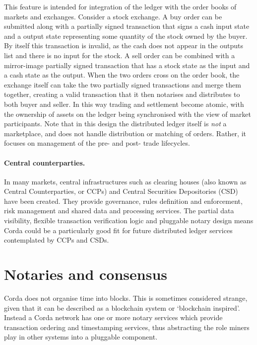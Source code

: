 \documentclass{article}
\begin{document}
This feature is intended for integration of the ledger with the order books of markets and exchanges. Consider a stock
exchange. A buy order can be submitted along with a partially signed transaction that signs a cash input state
and a output state representing some quantity of the stock owned by the buyer. By itself this transaction is invalid,
as the cash does not appear in the outputs list and there is no input for the stock. A sell order can be combined with
a mirror-image partially signed transaction that has a stock state as the input and a cash state as the output. When
the two orders cross on the order book, the exchange itself can take the two partially signed transactions and merge
them together, creating a valid transaction that it then notarises and distributes to both buyer and seller. In this
way trading and settlement become atomic, with the ownership of assets on the ledger being synchronised with the view
of market participants. Note that in this design the distributed ledger itself is \emph{not} a marketplace, and does
not handle distribution or matching of orders. Rather, it focuses on management of the pre- and post- trade lifecycles.

\paragraph{Central counterparties.}In many markets, central infrastructures such as clearing houses (also known as
Central Counterparties, or CCPs) and Central Securities Depositories (CSD) have been created. They provide governance,
rules definition and enforcement, risk management and shared data and processing services. The partial data visibility,
flexible transaction verification logic and pluggable notary design means Corda could be a particularly good fit for
future distributed ledger services contemplated by CCPs and CSDs.


\section{Notaries and consensus}\label{sec:notaries}

Corda does not organise time into blocks. This is sometimes considered strange, given that it can be described as a
blockchain system or `blockchain inspired'. Instead a Corda network has one or more notary services which provide
transaction ordering and timestamping services, thus abstracting the role miners play in other systems into a pluggable
component.
\end{document}
